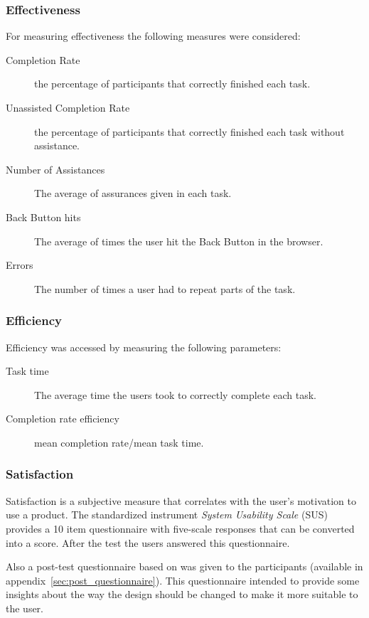 \documentclass[a4paper]{article}
\begin{document}
\subsubsection{Effectiveness}
For measuring effectiveness the following measures were considered:
  \begin{description}
    

    \item[Completion Rate] the percentage of participants that correctly finished each task.
 \item[Unassisted Completion Rate] the percentage of participants that correctly finished each task without assistance.
 \item[Number of Assistances] The average of assurances given in each task.
 \item[Back Button hits] The average of times the user hit the Back Button in the browser.
 \item[Errors] The number of times a user had to repeat parts of the task.
  \end{description} 
 
 \subsubsection{Efficiency}
 Efficiency was accessed by measuring the following parameters:
\begin{description}  

  \item[Task time] The average time the users took to correctly complete each task.
 \item[Completion rate efficiency] mean completion rate/mean task time.
\end{description} 
 
 \subsubsection{Satisfaction}
 Satisfaction is a subjective measure that correlates with the user's motivation to use a product. The standardized instrument \textit{System Usability Scale} (SUS) provides a 10 item questionnaire with five-scale responses that can be converted into a score. After the test the users answered this questionnaire. 
 
 Also a post-test questionnaire based on  was given to the participants (available in appendix~\ref{sec:post_questionnaire}). This questionnaire intended to provide some insights about the way the design should be changed to make it more suitable to the user.
 
\end{document}

